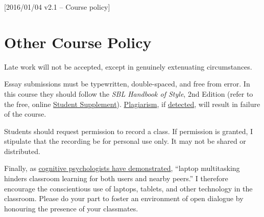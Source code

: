 [2016/01/04 v2.1 -- Course policy]

\section{Other Course Policy}
\label{policy}

Late work will not be accepted, except in genuinely extenuating
circumstances.

Essay submissions must be typewritten, double-spaced, and free from
error. In this course they should follow the \emph{SBL Handbook of Style},
2nd Edition (refer to the free, online \href{https://www.sbl-site.org/assets/pdfs/pubs/SBLHSsupp2015-02.pdf}{Student Supplement}).
\href{http://www.eerdmans.com/Pages/Item/59043/Commentary-Statement.aspx}{Plagiarism},
if \href{https://www.theguardian.com/world/2013/feb/09/german-education-minister-quits-phd-plagiarism}{detected},
will result in failure of the course.

Students should request permission to record a class. If permission is
granted, I stipulate that the recording be for personal use only. It may
not be shared or distributed.

Finally, as \href{http://dx.doi.org/10.1016/j.compedu.2012.10.003}{cognitive
psychologists have demonstrated}, ``laptop multitasking hinders
classroom learning for both users and nearby peers.'' I therefore
encourage the conscientious use of laptops, tablets, and other
technology in the classroom. Please do your part to foster an
environment of open dialogue by honouring the presence of your
classmates.